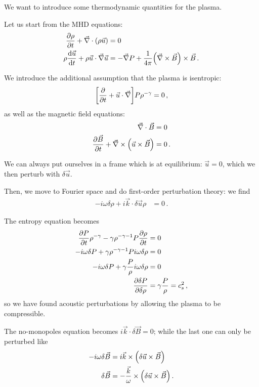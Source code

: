 \documentclass[main.tex]{subfiles}
\begin{document}

We want to introduce some thermodynamic quantities for the plasma. 

Let us start from the MHD equations: 
%
\begin{align}
\pdv{\rho }{t} + \vec{\nabla} \cdot (\rho \vec{u}) &=  0 \\
\rho \dv{\vec{u}}{t} + \rho \vec{u} \cdot \vec{\nabla} \vec{u} &= - \vec{\nabla} P + \frac{1}{4 \pi } \qty(\vec{\nabla} \times \vec{B}) \times \vec{B}
\,.
\end{align}

We introduce the additional assumption that the plasma is isentropic: 
%
\begin{align}
\qty[ \pdv{}{t} + \vec{u} \cdot \vec{\nabla}] P \rho^{-\gamma } = 0
\,,
\end{align}
%
as well as the magnetic field equations: 
%
\begin{align}
\vec{\nabla} \cdot \vec{B} &= 0  \\
\pdv{\vec{B}}{t} + \vec{\nabla} \times \qty(\vec{u} \times \vec{B}) &= 0
\,.
\end{align}

We can always put ourselves in a frame which is at equilibrium: \(\vec{u} = 0\), which we then perturb with \(\delta \vec{u}\). 

Then, we move to Fourier space and do first-order perturbation theory: we find 
%
\begin{align}
-i \omega \delta \rho + i \vec{k} \cdot \delta \vec{u} \rho &= 0  
\,.
\end{align}

The entropy equation becomes 
%
\begin{align}
\pdv{P }{t} \rho^{-\gamma } - \gamma \rho^{-\gamma -1} P \pdv{\rho }{t} &= 0  \\
- i \omega \delta P + \gamma \rho^{-\gamma -1} P i \omega \delta \rho  &= 0  \\
- i \omega \delta P + \gamma \frac{P}{\rho } i \omega \delta \rho &= 0  \\
\pdv{ \delta P}{ \delta \rho } &= \gamma \frac{P}{\rho } = c_s^2
\,,
\end{align}
%
so we have found acoustic perturbations by allowing the plasma to be compressible. 

The no-monopoles equation becomes \(i \vec{k} \cdot \delta \vec{B} = 0\); while the last one can only be perturbed like 
%
\begin{align}
- i \omega \delta \vec{B} &= i \vec{k} \times \qty( \delta \vec{u} \times \vec{B})  \\
\delta \vec{B} &= - \frac{\vec{k}}{\omega } \times \qty( \delta \vec{u} \times \vec{B}) 
\,.
\end{align}
\end{document}
